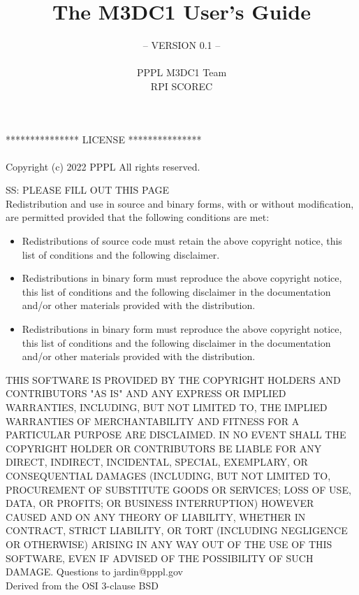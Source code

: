 \documentclass[11pt]{article}  %
\author{}
\title{}
\title{The M3DC1 User's Guide}
\author{-- VERSION 0.1 --\\
\\
PPPL M3DC1 Team \\
RPI SCOREC}
\begin{document}
\maketitle


\newpage

\newpage
***************     LICENSE     ***************
\\
\\
Copyright (c) 2022 PPPL
All rights reserved.
\newline
\newline

SS: PLEASE FILL OUT THIS PAGE\\
\newline
Redistribution and use in source and binary forms, with or without
modification, are permitted provided that the following conditions are met:

\begin{itemize}
\item Redistributions of source code must retain the above copyright notice,
  this list of conditions and the following disclaimer.

\item Redistributions in binary form must reproduce the above copyright notice,
  this list of conditions and the following disclaimer in the documentation
  and/or other materials provided with the distribution.

\item Redistributions in binary form must reproduce the above copyright notice,
  this list of conditions and the following disclaimer in the documentation
  and/or other materials provided with the distribution.
\end{itemize}

THIS SOFTWARE IS PROVIDED BY THE COPYRIGHT HOLDERS AND CONTRIBUTORS "AS IS"
AND ANY EXPRESS OR IMPLIED WARRANTIES, INCLUDING, BUT NOT LIMITED TO, THE
IMPLIED WARRANTIES OF MERCHANTABILITY AND FITNESS FOR A PARTICULAR PURPOSE ARE
DISCLAIMED. IN NO EVENT SHALL THE COPYRIGHT HOLDER OR CONTRIBUTORS BE LIABLE
FOR ANY DIRECT, INDIRECT, INCIDENTAL, SPECIAL, EXEMPLARY, OR CONSEQUENTIAL
DAMAGES (INCLUDING, BUT NOT LIMITED TO, PROCUREMENT OF SUBSTITUTE GOODS OR
SERVICES; LOSS OF USE, DATA, OR PROFITS; OR BUSINESS INTERRUPTION) HOWEVER
CAUSED AND ON ANY THEORY OF LIABILITY, WHETHER IN CONTRACT, STRICT LIABILITY,
OR TORT (INCLUDING NEGLIGENCE OR OTHERWISE) ARISING IN ANY WAY OUT OF THE USE
OF THIS SOFTWARE, EVEN IF ADVISED OF THE POSSIBILITY OF SUCH DAMAGE.
\newline
\newline
Questions to jardin@pppl.gov\\
Derived from the OSI 3-clause BSD
\newpage
\newpage
\end{document}
